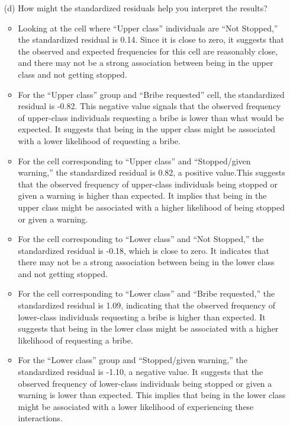 \documentclass[12pt,letterpaper]{article}
\begin{document}
\begin{enumerate}
\begin{table}[h]
\begin{tabular}{l | c c c }
			\end{tabular}
		\end{table}
	
	\vspace{7cm}
	\newpage
	\item [(d)] How might the standardized residuals help you interpret the results?  
	\begin{itemize}
		\item Looking at the cell where ``Upper class'' individuals are ``Not Stopped,'' the standardized residual is 0.14.  Since it is close to zero, it suggests that the observed and expected frequencies for this cell are reasonably close, and there may not be a strong association between being in the upper class and not getting stopped.
		\item For the ``Upper class'' group and ``Bribe requested'' cell, the standardized residual is -0.82. This negative value signals that the observed frequency of upper-class individuals requesting a bribe is lower than what would be expected. It suggests that being in the upper class might be associated with a lower likelihood of requesting a bribe.
		\item For the cell corresponding to “Upper class” and “Stopped/given warning,” the standardized residual is 0.82, a positive value.This suggests that the observed frequency of upper-class individuals being stopped or given a warning is higher than expected. It implies that being in the upper class might be associated with a higher likelihood of being stopped or given a warning.
		\item For the cell corresponding to “Lower class” and “Not Stopped,” the standardized residual is -0.18, which is close to zero. It indicates that there may not be a strong association between being in the lower class and not getting stopped.
		\item For the cell corresponding to “Lower class” and “Bribe requested,” the standardized residual is 1.09, indicating that the observed frequency of lower-class individuals requesting a bribe is higher than expected. It suggests that being in the lower class might be associated with a higher likelihood of requesting a bribe.
		\item For the ``Lower class'' group and ``Stopped/given warning,'' the standardized residual is -1.10, a negative value. It suggests that the observed frequency of lower-class individuals being stopped or given a warning is lower than expected. This implies that being in the lower class might be associated with a lower likelihood of experiencing these interactions.
		
		
		
		
		
	\end{itemize}
\end{enumerate}
\newpage
\end{document}
